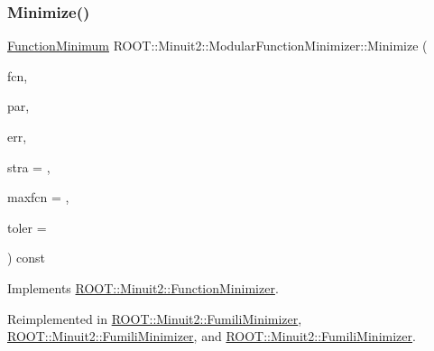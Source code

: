 \mbox{\label{classROOT_1_1Minuit2_1_1ModularFunctionMinimizer_a8cbcb596782a34f43e4ce1c48865d0b7}} 
\subsubsection{\texorpdfstring{Minimize()}{Minimize()}\hspace{0.1cm}{\footnotesize\ttfamily [1/33]}}
{\footnotesize\ttfamily \mbox{\hyperlink{classROOT_1_1Minuit2_1_1FunctionMinimum}{Function\+Minimum}} R\+O\+O\+T\+::\+Minuit2\+::\+Modular\+Function\+Minimizer\+::\+Minimize (\begin{DoxyParamCaption}\item[{const \mbox{\hyperlink{classROOT_1_1Minuit2_1_1FCNBase}{F\+C\+N\+Base}} \&}]{fcn,  }\item[{const std\+::vector$<$ double $>$ \&}]{par,  }\item[{const std\+::vector$<$ double $>$ \&}]{err,  }\item[{unsigned int}]{stra = {},  }\item[{unsigned int}]{maxfcn = {},  }\item[{double}]{toler = {} }\end{DoxyParamCaption}) const\hspace{0.3cm}{\ttfamily [virtual]}}



Implements \mbox{\hyperlink{classROOT_1_1Minuit2_1_1FunctionMinimizer_aa664d755554be28f42be8270b8c35139}{R\+O\+O\+T\+::\+Minuit2\+::\+Function\+Minimizer}}.



Reimplemented in \mbox{\hyperlink{classROOT_1_1Minuit2_1_1FumiliMinimizer_ab9ec6dd4a0e664db7d23a3ea3b0a3c75}{R\+O\+O\+T\+::\+Minuit2\+::\+Fumili\+Minimizer}}, \mbox{\hyperlink{classROOT_1_1Minuit2_1_1FumiliMinimizer_ab9ec6dd4a0e664db7d23a3ea3b0a3c75}{R\+O\+O\+T\+::\+Minuit2\+::\+Fumili\+Minimizer}}, and \mbox{\hyperlink{classROOT_1_1Minuit2_1_1FumiliMinimizer_ab9ec6dd4a0e664db7d23a3ea3b0a3c75}{R\+O\+O\+T\+::\+Minuit2\+::\+Fumili\+Minimizer}}.

